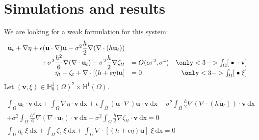 \documentclass[compress,t]{beamer}
\begin{document}
	\section{Simulations and results}
			\begin{frame}
				We are looking for a weak formulation for this system: 
				\begin{equation*}
					\begin{array}{rlr}
						\mathbf{u}_t + \nabla \eta + \epsilon (\mathbf{u} \cdot \nabla)\mathbf{u} - \sigma^2\dfrac{h}{2}\nabla (\nabla \cdot (h \mathbf{u}_t)) & & \\
						+ \sigma^2 \dfrac{h^2}{6}\nabla (\nabla \cdot \mathbf{u}_t) - \sigma^2\dfrac{h}{2}\nabla \zeta_{tt}  & = O(\epsilon \sigma^2, \sigma^4) & \only<3->{\int_{\Omega}[\; \bullet \; \cdot \mathbf{v}]}\\
					\eta_t+\zeta_t + \nabla \cdot [(h + \epsilon\eta )\mathbf{u} ] & = 0 & \only<3->{\int_{\Omega}[\; \bullet \; \xi]}
					\end{array}	
				\end{equation*}
				\pause
				Let $(\mathbf{v},\xi) \in \mathbb{H}^1_0(\Omega)^2 \times \mathbb{H}^1(\Omega)$.
				\pause
				\pause 
				\begin{small}
					\begin{equation*}
						\begin{split}
							\int_{\Omega} \! \mathbf{u}_t \cdot \mathbf{v} \: \mathrm{dx} + \int_{\Omega} \! \nabla \eta \cdot \mathbf{v} \: \mathrm{dx} + \epsilon \! \int_{\Omega} \! (\mathbf{u} \cdot \nabla ) \mathbf{u} \cdot \mathbf{v} \: \mathrm{dx} - \sigma^2 \! \int_{\Omega} \! \frac{h}{2} \nabla (\nabla \cdot (h \mathbf{u}_t)) \cdot \mathbf{v} \: \mathrm{dx} \\
							+ \sigma^2 \! \int_{\Omega} \! \frac{h^2}{6} \nabla (\nabla \cdot \mathbf{u}_t) \cdot \mathbf{v} \: \mathrm{dx} - \sigma^2 \! \int_{\Omega} \! \frac{h}{2} \nabla \zeta_{tt} \cdot \mathbf{v} \: \mathrm{dx} = 0\\
							\int_{\Omega}\! \eta_t \; \xi \: \mathrm{dx} +\int_{\Omega}\! \zeta_t \; \xi \: \mathrm{dx} +\int_{\Omega}\! \nabla \cdot [(h+\epsilon\eta) \mathbf{u}] \; \xi \: \mathrm{dx} = 0
						\end{split}
					\end{equation*}
				\end{small}		  
			\end{frame}
\end{document}
